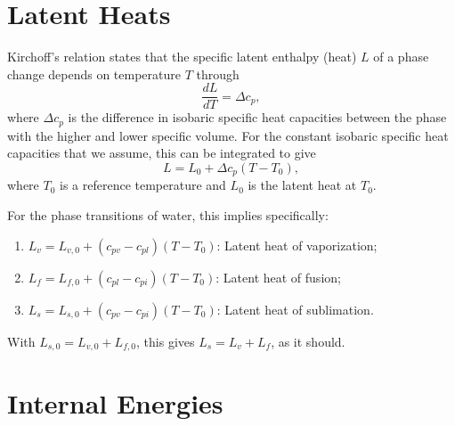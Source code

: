 \documentclass{report}
\begin{document}
\section{Latent Heats}

Kirchoff's relation states that the specific latent enthalpy (heat) $L$ of a phase change depends on temperature $T$ through
\begin{equation}
    \frac{dL}{dT} = \Delta c_p,
\end{equation}
where $\Delta c_p$ is the difference in isobaric specific heat capacities between the phase with the higher and lower specific volume. For the constant isobaric specific heat capacities that we assume, this can be integrated to give
\begin{equation}
    L = L_0 + \Delta c_p (T-T_0),
    \label{eq:LH_temperature}
\end{equation}
where $T_0$ is a reference temperature and $L_0$ is the latent heat at $T_0$. 

For the phase transitions of water, this implies specifically:
\begin{enumerate}
    \item $L_v = L_{v,0} + (c_{pv} - c_{pl}) (T - T_0)$: Latent heat of vaporization;
    \item $L_f = L_{f,0} + (c_{pl} - c_{pi}) (T - T_0)$: Latent heat of fusion;
    \item $L_s = L_{s,0} + (c_{pv} - c_{pi}) (T - T_0)$: Latent heat of sublimation.
\end{enumerate}
With $L_{s,0} = L_{v,0} + L_{f,0}$, this gives $L_s = L_v + L_f$, as it should.

\section{Internal Energies}\label{s:internal_energies}
\end{document}
